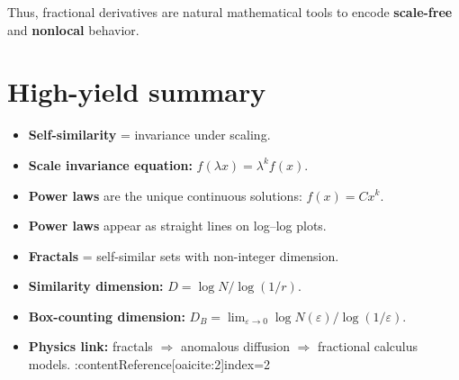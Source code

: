 Thus, fractional derivatives are natural mathematical tools to encode
\textbf{scale-free} and \textbf{nonlocal} behavior.


\section{High-yield summary}
\begin{itemize}
\item \textbf{Self-similarity} = invariance under scaling.
\item \textbf{Scale invariance equation:} $f(\lambda x)=\lambda^k f(x)$.
\item \textbf{Power laws} are the unique continuous solutions: $f(x)=Cx^k$.
\item \textbf{Power laws} appear as straight lines on log--log plots.
\item \textbf{Fractals} = self-similar sets with non-integer dimension.
\item \textbf{Similarity dimension:} $D=\log N/\log(1/r)$.
\item \textbf{Box-counting dimension:} $D_B=\lim_{\varepsilon\to 0}\log N(\varepsilon)/\log(1/\varepsilon)$.
\item \textbf{Physics link:} fractals $\Rightarrow$ anomalous diffusion $\Rightarrow$ fractional calculus models. :contentReference[oaicite:2]{index=2}
\end{itemize}
